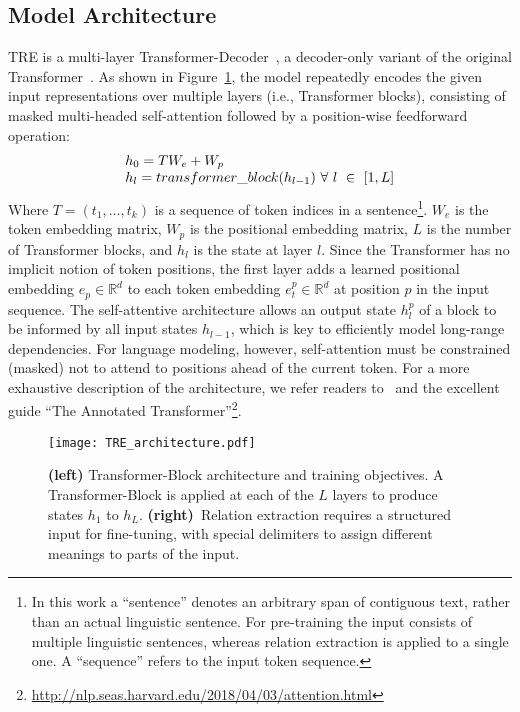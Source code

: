 \documentclass[akbc,twoside,11pt]{article}
\begin{document}
\subsection{Model Architecture}
\label{sec:model_architecture}
TRE is a multi-layer Transformer-Decoder~\cite{liu_generatingwb_2018}, a decoder-only variant of the original Transformer~\cite{vaswani_attention_2017}. As shown in Figure~\ref{fig:model_architecture}, the model repeatedly encodes the given input representations over multiple layers (i.e., Transformer blocks), consisting of masked multi-headed self-attention followed by a position-wise feedforward operation:
\begin{equation}
    \begin{tabular}{l}
        $h_0 = T W_e + W_p$ \\
        $h_l = transformer\_block(h_{l-1})\ \forall\ l\ \in\ [1, L]$ \\
    \end{tabular}
\end{equation}
Where $T = (t_{1}, \ldots, t_{k})$ is a sequence of token indices in a sentence\footnote{In this work a ``sentence'' denotes an arbitrary span of contiguous text, rather than an actual linguistic sentence. For pre-training the input consists of multiple linguistic sentences, whereas relation extraction is applied to a single one. A ``sequence'' refers to the input token sequence.}. $W_e$ is the token embedding matrix, $W_p$ is the positional embedding matrix, $L$ is the number of Transformer blocks, and $h_l$ is the state at layer $l$. Since the Transformer has no implicit notion of token positions, the first layer adds a learned positional embedding $e_p \in \mathbb{R}^d$ to each token embedding $e^p_t \in \mathbb{R}^d$ at position $p$ in the input sequence. The self-attentive architecture allows an output state $h^p_l$ of a block to be informed by all input states $h_{l-1}$, which is key to efficiently model long-range dependencies. For language modeling, however, self-attention must be constrained (masked) not to attend to positions ahead of the current token.
For a more exhaustive description of the architecture, we refer readers to~\citet{vaswani_attention_2017} and the excellent guide ``The Annotated Transformer''\footnote{\url{http://nlp.seas.harvard.edu/2018/04/03/attention.html}}.

\begin{figure}[ht!]
\centering
\texttt{[image: TRE\_architecture.pdf]}
\caption{\textbf{(left)} Transformer-Block architecture and training objectives. A Transformer-Block is applied at each of the $L$ layers to produce states $h_1$ to $h_L$. \textbf{(right)}~Relation extraction requires a structured input for fine-tuning, with special delimiters to assign different meanings to parts of the input.}\label{fig:model_architecture}
\end{figure}
\end{document}
